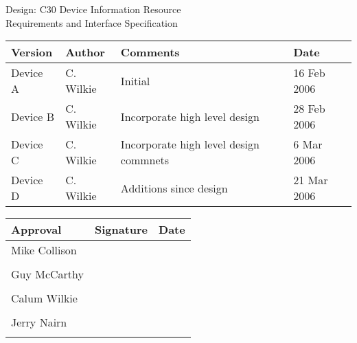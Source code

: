 \documentclass{article}
\begin{document}
\begin{titlepage}
\begin{center}
\LARGE{Design: C30 Device Information Resource} \\
\vspace{10 mm}
Requirements and Interface Specification \\
\vspace{5 mm}
\begin{small}
\begin{tabular}{|l|l|p{7cm}|l|} \hline
Version&Author&Comments&Date\\
\hline
Device A&C. Wilkie& Initial& 16 Feb 2006\\
Device B&C. Wilkie& Incorporate high level design& 28 Feb 2006\\
Device C&C. Wilkie& Incorporate high level design commnets& 6 Mar 2006\\
Device D&C. Wilkie& Additions since design& 21 Mar 2006\\
\hline
\end{tabular}
\newline
\vspace{50mm}
\begin{tabular}{|l|l|l|} \hline
  Approval & Signature & Date\\
\hline
  Mike Collison & \hspace{55mm} & \hspace{20mm} \\
  \hspace{40mm} & \hspace{55mm} & \hspace{20mm} \\
\hline
  Guy McCarthy & \hspace{55mm} & \hspace{20mm} \\
  \hspace{40mm} & \hspace{55mm} & \hspace{20mm} \\
\hline
  Calum Wilkie & \hspace{55mm} & \hspace{20mm} \\
  \hspace{40mm} & \hspace{55mm} & \hspace{20mm} \\
\hline
  Jerry Nairn & \hspace{55mm} & \hspace{20mm} \\
  \hspace{40mm} & \hspace{55mm} & \hspace{20mm} \\
\hline
\end{tabular}

\end{small}
\end{center}
\end{titlepage}
\tableofcontents
\pagebreak
\end{document}
